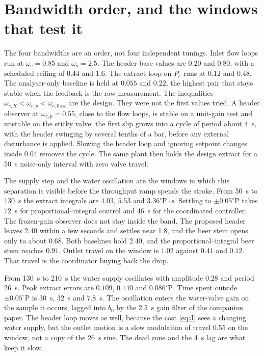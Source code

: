 \documentclass[conference,a4paper]{IEEEtran}
\newcommand{\degP}{^{\circ}\mathrm{P}}
\begin{document}
\section{Bandwidth order, and the windows that test it}

The four bandwidths are an order, not four independent tunings. Inlet flow loops run at $\omega_c=0.85$ and $\omega_o=2.5$. The header base values are $0.20$ and $0.80$, with a scheduled ceiling of $0.44$ and $1.6$. The extract loop on $P_c$ runs at $0.12$ and $0.48$. The analyser-only baseline is held at $0.055$ and $0.22$, the highest pair that stays stable when the feedback is the raw measurement. The inequalities $\omega_{c,R}<\omega_{c,p}<\omega_{c,\mathrm{flow}}$ are the design. They were not the first values tried. A header observer at $\omega_{c,p}=0.55$, close to the flow loops, is stable on a unit-gain test and unstable on the sticky valve: the first slip grows into a cycle of period about \SI{4}{s}, with the header swinging by several tenths of a bar, before any external disturbance is applied. Slowing the header loop and ignoring setpoint changes inside \SI{0.04}{\barg} removes the cycle. The same plant then holds the design extract for a \SI{50}{s} noise-only interval with zero valve travel.

The supply step and the water oscillation are the windows in which this separation is visible before the throughput ramp spends the stroke. From \SI{50}{s} to \SI{130}{s} the extract integrals are $4.03$, $5.53$ and $3.36\degP\cdot\mathrm{s}$. Settling to $\pm 0.05\degP$ takes \SI{72}{s} for proportional--integral control and \SI{46}{s} for the coordinated controller. The frozen-gain observer does not stay inside the band. The proposed header leaves \SI{2.40}{\barg} within a few seconds and settles near \SI{1.8}{\barg}, and the beer stem opens only to about $0.68$. Both baselines hold \SI{2.40}{\barg}, and the proportional--integral beer stem reaches $0.91$. Outlet travel on the window is $1.02$ against $0.41$ and $0.12$. That travel is the coordinator buying back the drop.

From \SI{130}{s} to \SI{210}{s} the water supply oscillates with amplitude \SI{0.28}{\barg} and period \SI{26}{s}. Peak extract errors are $0.109$, $0.140$ and $0.086\degP$. Time spent outside $\pm 0.05\degP$ is \SI{30}{s}, \SI{32}{s} and \SI{7.8}{s}. The oscillation enters the water-valve gain on the sample it occurs, lagged into $b_0$ by the \SI{2.5}{s} gain filter of the companion paper. The header loop moves as well, because the cost \eqref{eq:J} sees a changing water supply, but the outlet motion is a slow modulation of travel $0.55$ on the window, not a copy of the \SI{26}{s} sine. The dead zone and the \SI{4}{s} lag are what keep it slow.
\end{document}
